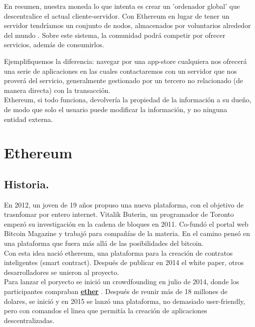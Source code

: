 \documentclass[11pt,a4paper]{article}
\begin{document}

En resumen, nuestra moneda lo que intenta es crear un 'ordenador  global' que descentralice el actual cliente-servidor. Con Ethereum en lugar de tener un servidor tendríamos un conjunto de nodos, almacenados por voluntarios alrededor del mundo . Sobre este sistema, la comunidad podrá competir por ofrecer servicios, además de consumirlos.


Ejemplifiquemos la diferencia: navegar por una app-store cualquiera nos ofrecerá una serie de aplicaciones en las cuales contactaremos con un servidor que nos proverá del servicio, generalmente gestionado por un tercero no relacionado (de manera directa) con la transacción.\\

Ethereum, si todo funciona, devolvería la propiedad de la información a su dueño, de modo que solo el usuario puede modificar la información, y no ninguna entidad externa.\\



\section{Ethereum\\}


\subsection{Historia.}
En 2012, un joven de 19 años propuso una nueva plataforma, con el objetivo de trasnfomar por entero internet. Vitalik Buterin, un programador de Toronto empezó su investigación en la cadena de bloques en 2011. Co-fundó el portal web Bitcoin Magazine y trabajó para compañías de la materia. En el camino pensó en una plataforma que fuera más allá de las posibilidades del bitcoin.\\

Con esta idea nació ethereum, una plataforma para la creación de contratos inteligentes (smart contract). Después de publicar en 2014 el white paper, otros desarrolladores se unieron al proyecto. \\

Para lanzar el poryecto se inició un crowdfounding en julio de 2014, donde los participantes compraban \hyperref[sec:ether]{\textbf{\underline{ether}}} . Después de reunir más de 18 millones de dolares, se inició y en 2015 se lanzó una plataforma, no demasiado user-friendly, pero con comandos el linea que permitía la creación de aplicaciones descentralizadas.\\
\end{document}
